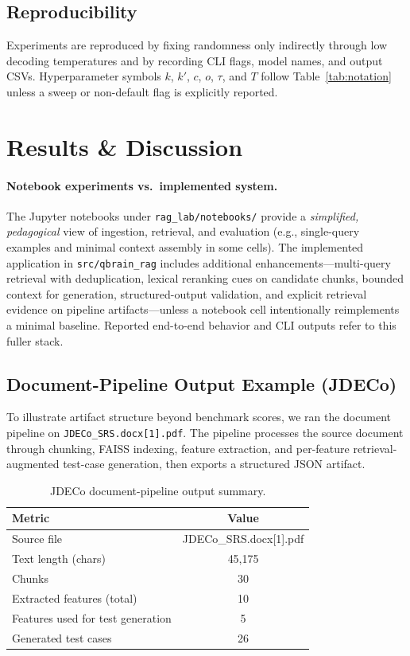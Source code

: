 \documentclass[conference]{IEEEtran}
\begin{document}
\subsection{Reproducibility}

Experiments are reproduced by fixing randomness only indirectly through low decoding temperatures and by recording CLI flags, model names, and output CSVs. Hyperparameter symbols $k$, $k'$, $c$, $o$, $\tau$, and $T$ follow Table~\ref{tab:notation} unless a sweep or non-default flag is explicitly reported.

\section{Results \& Discussion}
\label{sec:results}

\paragraph{Notebook experiments vs.\ implemented system.}
The Jupyter notebooks under \texttt{rag\_lab/notebooks/} provide a \emph{simplified, pedagogical} view of ingestion, retrieval, and evaluation (e.g., single-query examples and minimal context assembly in some cells). The implemented application in \texttt{src/qbrain\_rag} includes additional enhancements---multi-query retrieval with deduplication, lexical reranking cues on candidate chunks, bounded context for generation, structured-output validation, and explicit retrieval evidence on pipeline artifacts---unless a notebook cell intentionally reimplements a minimal baseline. Reported end-to-end behavior and CLI outputs refer to this fuller stack.

\subsection{Document-Pipeline Output Example (JDECo)}

To illustrate artifact structure beyond benchmark scores, we ran the document pipeline on \texttt{JDECo\_SRS.docx[1].pdf}. The pipeline processes the source document through chunking, FAISS indexing, feature extraction, and per-feature retrieval-augmented test-case generation, then exports a structured JSON artifact.

\begin{table}[h]
\centering
\caption{JDECo document-pipeline output summary.}
\label{tab:jdeco_output_summary}
\begin{tabular}{lc}
\hline
Metric & Value \\
\hline
Source file & JDECo\_SRS.docx[1].pdf \\
Text length (chars) & 45,175 \\
Chunks & 30 \\
Extracted features (total) & 10 \\
Features used for test generation & 5 \\
Generated test cases & 26 \\
\hline
\end{tabular}
\end{table}
\end{document}
